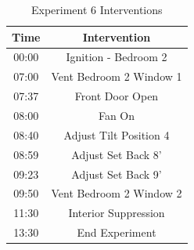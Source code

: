 \documentclass{article}
\begin{document}
\begin{table}[H]
	\centering
	\caption{Experiment 6 Interventions}
	\begin{tabular}{|c|c|} 
		\hline
		Time & Intervention \\ \hline \hline
		00:00 & Ignition - Bedroom 2 \\ \hline
		07:00 & Vent Bedroom 2 Window 1 \\ \hline
		07:37 & Front Door Open \\ \hline
		08:00 & Fan On \\ \hline
		08:40 & Adjust Tilt Position 4 \\ \hline
		08:59 & Adjust Set Back 8' \\ \hline
		09:23 & Adjust Set Back 9' \\ \hline
		09:50 & Vent Bedroom 2 Window 2 \\ \hline
		11:30 & Interior Suppression \\ \hline
		13:30 & End Experiment \\ \hline
	\end{tabular}
	\label{Table:Exp6Interventions}
\end{table}
\end{document}
